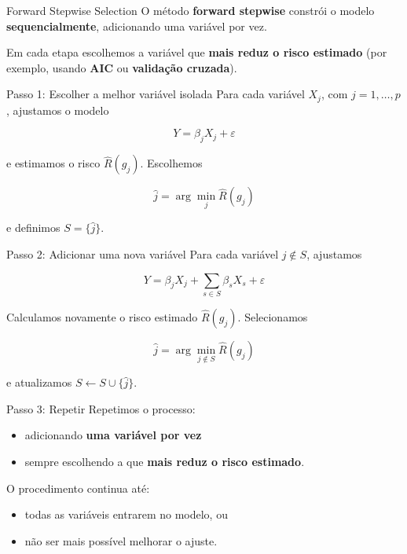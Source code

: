 \documentclass[
  ignorenonframetext,
  aspectratio=169,
]{beamer}
\providecommand{\tightlist}{%
  \setlength{\itemsep}{0pt}\setlength{\parskip}{0pt}}
\begin{document}
\begin{frame}
\begin{block}{Forward Stepwise Selection}
\label{forward-stepwise-selection}
O método \textbf{forward stepwise} constrói o modelo
\textbf{sequencialmente}, adicionando uma variável por vez.

Em cada etapa escolhemos a variável que \textbf{mais reduz o risco
estimado} (por exemplo, usando \textbf{AIC} ou \textbf{validação
cruzada}).
\end{block}
\end{frame}

\begin{frame}
\begin{block}{Passo 1: Escolher a melhor variável isolada}
\label{passo-1-escolher-a-melhor-variuxe1vel-isolada}
Para cada variável \(X_j\), com \(j=1,\dots,p\), ajustamos o modelo

\[
Y = \beta_j X_j + \varepsilon
\]

e estimamos o risco \(\hat{R}(g_j)\). Escolhemos

\[
\hat{j} = \arg\min_j \hat{R}(g_j)
\]

e definimos \(S = \{\hat{j}\}\).
\end{block}
\end{frame}

\begin{frame}
\begin{block}{Passo 2: Adicionar uma nova variável}
\label{passo-2-adicionar-uma-nova-variuxe1vel}
Para cada variável \(j \notin S\), ajustamos

\[
Y = \beta_j X_j + \sum_{s \in S} \beta_s X_s + \varepsilon
\]

Calculamos novamente o risco estimado \(\hat{R}(g_j)\). Selecionamos

\[
\hat{j} = \arg\min_{j \notin S} \hat{R}(g_j)
\]

e atualizamos \(S \leftarrow S \cup \{\hat{j}\}.\)
\end{block}
\end{frame}

\begin{frame}
\begin{block}{Passo 3: Repetir}
\label{passo-3-repetir}
Repetimos o processo:

\begin{itemize}
\tightlist
\item
  adicionando \textbf{uma variável por vez}
\item
  sempre escolhendo a que \textbf{mais reduz o risco estimado}.
\end{itemize}

O procedimento continua até:

\begin{itemize}
\tightlist
\item
  todas as variáveis entrarem no modelo, ou
\item
  não ser mais possível melhorar o ajuste.
\end{itemize}
\end{block}
\end{frame}
\end{document}
